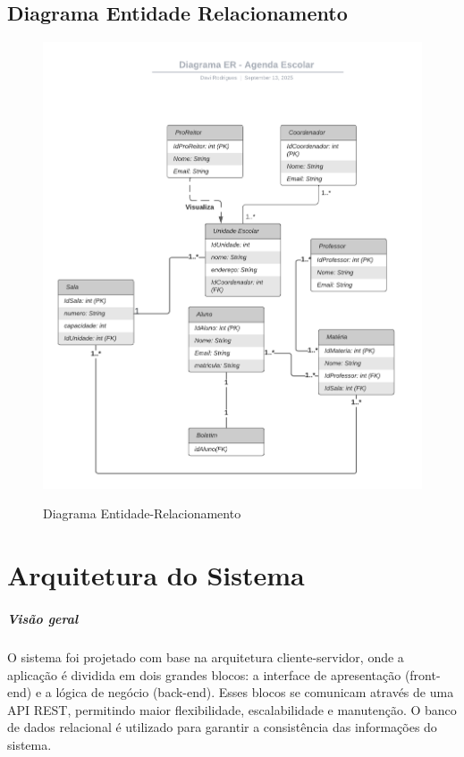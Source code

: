 \documentclass[12pt,a4paper]{report}
\begin{document}
\section{Diagrama Entidade Relacionamento}
\begin{figure}[h!]
\centering
\includegraphics[width=\linewidth]{imagens/der.png}
\label{Diagrama Entidade-Relacionamento}
\caption{Diagrama Entidade-Relacionamento}
\end{figure}

\chapter{Arquitetura do Sistema}
\paragraph{Visão geral} O sistema foi projetado com base na arquitetura cliente-servidor, onde a aplicação é dividida em dois grandes blocos: a interface de apresentação (front-end) e a lógica de negócio (back-end). Esses blocos se comunicam através de uma API REST, permitindo maior flexibilidade, escalabilidade e manutenção.
O banco de dados relacional é utilizado para garantir a consistência das informações do sistema.
\end{document}
